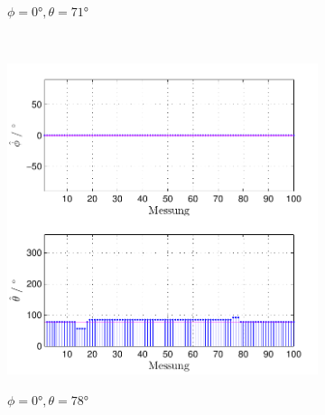 \begin{figure}
\begin{subfigure}[b]{0.48\textwidth}
                \label{fig:Foto_DSP_Draufsicht}
                \caption{$\phi=0°, \theta = 71°$}
        \end{subfigure}
        ~ %
        \begin{subfigure}[b]{0.48\textwidth}
                \centering
                \includegraphics[width=\textwidth]{grafiken/04_Echtzeitversuch/MALE_Phi_0_Theta_78}
                \label{fig:Foto_DSP_Draufsicht}
                \caption{$\phi=0°, \theta = 78°$}
        \end{subfigure}
         ~ %
        \begin{subfigure}[b]{0.48\textwidth}
                \centering

\end{subfigure}
\end{figure}
